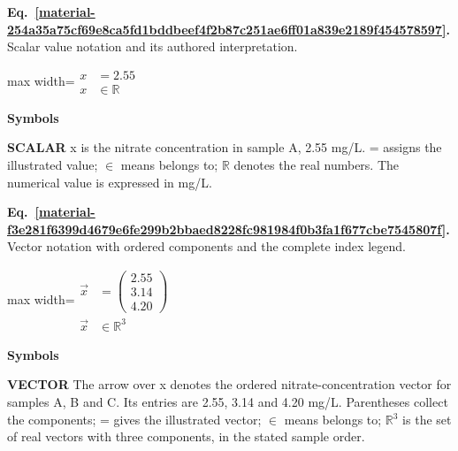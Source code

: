 \documentclass[11pt,a4paper]{article}
\begin{document}
\par\medskip
\begin{samepage}
\label{material-254a35a75cf69e8ca5fd1bddbeef4f2b87c251ae6ff01a839e2189f454578597}
\noindent\textbf{Eq.~\ref*{material-254a35a75cf69e8ca5fd1bddbeef4f2b87c251ae6ff01a839e2189f454578597}.} Scalar value notation and its authored interpretation.\par\nopagebreak
\begin{center}\begin{adjustbox}{max width=\linewidth}$\displaystyle \begin{aligned}x &= 2.55\\ x &\in \mathbb{R}\end{aligned}$\end{adjustbox}\end{center}

\par\noindent\textbf{Symbols}

\par\noindent\textbf{SCALAR} x is the nitrate concentration in sample A, 2.55 mg/L. = assigns the illustrated value; \ensuremath{\in} means belongs to; \ensuremath{\mathbb{R}} denotes the real numbers. The numerical value is expressed in mg/L.

\end{samepage}
\medskip

\par\medskip
\begin{samepage}
\label{material-f3e281f6399d4679e6fe299b2bbaed8228fc981984f0b3fa1f677cbe7545807f}
\noindent\textbf{Eq.~\ref*{material-f3e281f6399d4679e6fe299b2bbaed8228fc981984f0b3fa1f677cbe7545807f}.} Vector notation with ordered components and the complete index legend.\par\nopagebreak
\begin{center}\begin{adjustbox}{max width=\linewidth}$\displaystyle \begin{aligned}\vec{x} &= \begin{pmatrix}2.55\\3.14\\4.20\end{pmatrix}\\ \vec{x} &\in \mathbb{R}^{3}\end{aligned}$\end{adjustbox}\end{center}

\par\noindent\textbf{Symbols}

\par\noindent\textbf{VECTOR} The arrow over x denotes the ordered nitrate-concentration vector for samples A, B and C. Its entries are 2.55, 3.14 and 4.20 mg/L. Parentheses collect the components; = gives the illustrated vector; \ensuremath{\in} means belongs to; \ensuremath{\mathbb{R}}\ensuremath{{}^3} is the set of real vectors with three components, in the stated sample order.

\end{samepage}
\medskip
\end{document}
